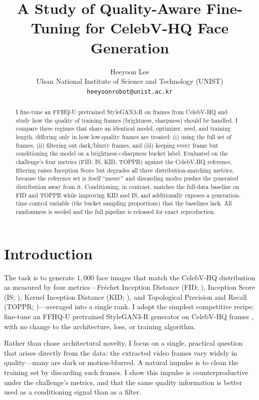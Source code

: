 \documentclass{article}
\title{A Study of Quality-Aware Fine-Tuning for CelebV-HQ Face Generation}
\author{%
  Heeyoon Lee \\
  Ulsan National Institute of Science and Technology (UNIST) \\
  \texttt{heeyoonrobot@unist.ac.kr} \\
}
\begin{document}
\maketitle

\begin{abstract}
I fine-tune an FFHQ-U pretrained StyleGAN3-R on frames from CelebV-HQ and study how the quality of training frames (brightness, sharpness)
should be handled. I compare three regimes that share an identical model,
optimizer, seed, and training length, differing only in how low-quality frames
are treated: (i) using the full set of frames, (ii) filtering
out dark/blurry frames, and (iii) keeping every frame but conditioning
the model on a brightness$\times$sharpness bucket label. Evaluated on the
challenge's four metrics (FID, IS, KID, TOPPR) against the CelebV-HQ reference, filtering raises Inception Score but degrades all three
distribution-matching metrics, because the reference set is itself ``messy'' and
discarding modes pushes the generated distribution away from it. Conditioning,
in contrast, matches the full-data baseline on FID and TOPPR while
improving KID and IS, and additionally exposes a generation-time control variable
(the bucket sampling proportions) that the baselines lack. All randomness is
seeded and the full pipeline is released for exact reproduction.
\end{abstract}

\section{Introduction}
The task is to generate $1{,}000$ face images that match the CelebV-HQ
distribution as measured by four metrics---Fr\'echet Inception Distance (FID;
\citealp{heusel2017fid}), Inception Score (IS; \citealp{salimans2016is}), Kernel
Inception Distance (KID; \citealp{binkowski2018kid}), and Topological Precision
and Recall (TOPPR; \citealp{kim2023toppr})---averaged into a single rank. I
adopt the simplest competitive recipe: fine-tune an FFHQ-U pretrained
StyleGAN3-R generator \citep{karras2021alias} on CelebV-HQ frames
\citep{zhu2022celebvhq}, with no change to the architecture, loss, or training
algorithm.

Rather than chase architectural novelty, I focus on a single, practical
question that arises directly from the data: the extracted video frames vary
widely in quality---many are dark or motion-blurred. A natural impulse is
to clean the training set by discarding such frames. I show this impulse is
counterproductive under the challenge's metrics, and that the same quality
information is better used as a conditioning signal than as a filter.
\end{document}
